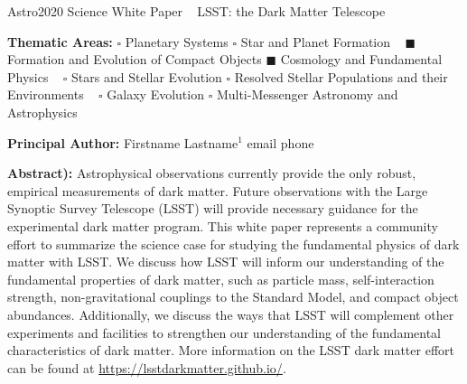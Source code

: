 \documentclass[12pt]{article}
\begin{document}
\begin{raggedright} 
\huge
Astro2020 Science White Paper \hfill ~ \linebreak
LSST: the Dark Matter Telescope \hfill ~ \linebreak
\end{raggedright}
\normalsize

\noindent \textbf{Thematic Areas:} \hspace*{58pt} $\square$ Planetary Systems \hspace*{12pt} $\square$ Star and Planet Formation  \hfill ~\linebreak
$\blacksquare$ Formation and Evolution of Compact Objects \hspace*{31pt} $\blacksquare$ Cosmology and Fundamental Physics \hfill ~ \linebreak
  $\square$  Stars and Stellar Evolution \hspace*{1pt} $\square$ Resolved Stellar Populations and their Environments \hspace*{40pt} \hfill ~\linebreak
  $\square$    Galaxy Evolution   \hspace*{45pt} $\square$             Multi-Messenger Astronomy and Astrophysics \hspace*{65pt} \hfill ~ \linebreak
  
\noindent \textbf{Principal Author:} 
Firstname Lastname$^{1}$ email phone



\noindent \textbf{Abstract):}
Astrophysical observations currently provide the only robust, empirical measurements of dark matter. Future observations with the Large Synoptic Survey Telescope (LSST) will provide necessary guidance for the experimental dark matter program. This white paper represents a community effort to summarize the science case for studying the fundamental physics of dark matter with LSST. We discuss how LSST will inform our understanding of the fundamental properties of dark matter, such as particle mass, self-interaction strength, non-gravitational couplings to the Standard Model, and compact object abundances. Additionally, we discuss the ways that LSST will complement other experiments and facilities to strengthen our understanding of the fundamental characteristics of dark matter. More information on the LSST dark matter effort can be found at \href{https://lsstdarkmatter.github.io/}{https://lsstdarkmatter.github.io/}.
\end{document}
